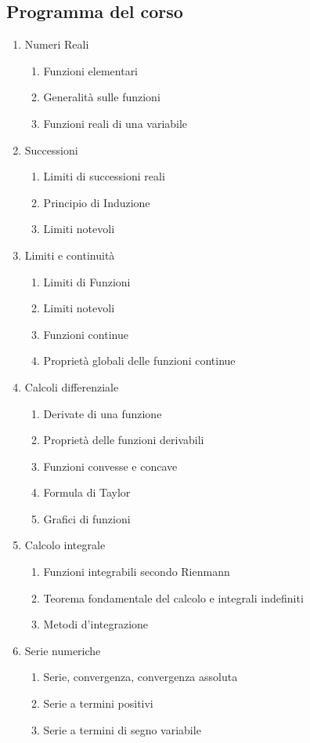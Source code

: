 \documentclass[12pt, a4paper, openany]{book}
\begin{document}
\subsection*{Programma del corso}
\begin{enumerate}
	\item Numeri Reali
	      \begin{enumerate}
		      \item Funzioni elementari
		      \item Generalità sulle funzioni
		      \item Funzioni reali di una variabile
	      \end{enumerate}
	\item Successioni
	      \begin{enumerate}
		      \item Limiti di successioni reali
		      \item Principio di Induzione
		      \item Limiti notevoli
	      \end{enumerate}
	\item Limiti e continuità
	      \begin{enumerate}
		      \item Limiti di Funzioni
		      \item Limiti notevoli
		      \item Funzioni continue
		      \item Proprietà globali delle funzioni continue
	      \end{enumerate}
	\item Calcoli differenziale
	      \begin{enumerate}
		      \item Derivate di una funzione
		      \item Proprietà delle funzioni derivabili
		      \item Funzioni convesse e concave
		      \item Formula di Taylor
		      \item Grafici di funzioni
	      \end{enumerate}
	\item Calcolo integrale
	      \begin{enumerate}
		      \item Funzioni integrabili secondo Rienmann
		      \item Teorema fondamentale del calcolo e integrali indefiniti
		      \item Metodi d'integrazione
	      \end{enumerate}
	\item Serie numeriche
	      \begin{enumerate}
		      \item Serie, convergenza, convergenza assoluta
		      \item Serie a termini positivi
		      \item Serie a termini di segno variabile
	      \end{enumerate}
\end{enumerate}
\end{document}
